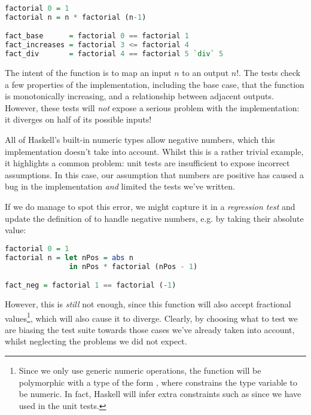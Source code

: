 \begin{lstlisting}[language=Haskell, xleftmargin=.2\textwidth, xrightmargin=.2\textwidth]
factorial 0 = 1
factorial n = n * factorial (n-1)

fact_base      = factorial 0 == factorial 1
fact_increases = factorial 3 <= factorial 4
fact_div       = factorial 4 == factorial 5 `div` 5
\end{lstlisting}

The intent of the function is to map an input $n$ to an output $n!$. The tests check a few properties of the implementation, including the base case, that the function is monotonically increasing, and a relationship between adjacent outputs. However, these tests will \emph{not} expose a serious problem with the implementation: it diverges on half of its possible inputs!

All of Haskell's built-in numeric types allow negative numbers, which this implementation doesn't take into account. Whilst this is a rather trivial example, it highlights a common problem: unit tests are insufficient to expose incorrect assumptions. In this case, our assumption that numbers are positive has caused a bug in the implementation \emph{and} limited the tests we've written.

If we do manage to spot this error, we might capture it in a \emph{regression test} and update the definition of  to handle negative numbers, e.g. by taking their absolute value:

\begin{lstlisting}[language=Haskell, xleftmargin=.2\textwidth, xrightmargin=.2\textwidth]
factorial 0 = 1
factorial n = let nPos = abs n
               in nPos * factorial (nPos - 1)

fact_neg = factorial 1 == factorial (-1)
\end{lstlisting}

However, this is \emph{still} not enough, since this function will also accept fractional values\footnote{Since we only use generic numeric operations, the function will be polymorphic with a type of the form , where  constrains the type variable  to be numeric. In fact, Haskell will infer extra constraints such as  since we have used \hs{==} in the unit tests.}, which will also cause it to diverge. Clearly, by choosing what to test we are biasing the test suite towards those cases we've already taken into account, whilst neglecting the problems we did not expect.

